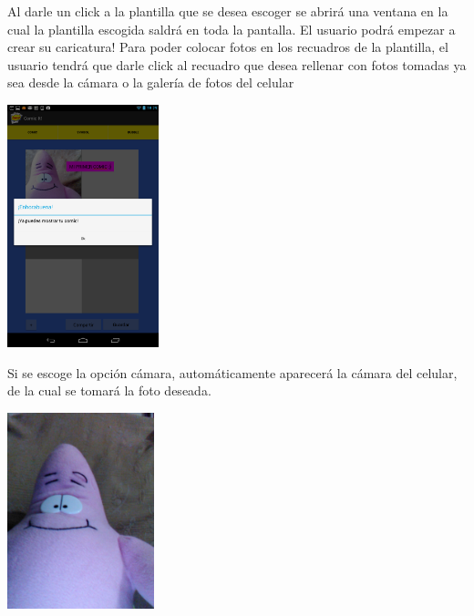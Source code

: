 \documentclass[12pt]{report}
\begin{document}
Al darle un click a la plantilla que se desea escoger se abrirá una ventana en la cual la plantilla escogida saldrá en toda la pantalla. El usuario podrá empezar a crear su caricatura!
Para poder colocar fotos en los recuadros de la plantilla, el usuario tendrá que darle click al recuadro que desea rellenar con fotos tomadas ya sea desde la cámara o la galería de fotos del celular
\newline
\newline
	\begin{center}
		\begingroup
			\includegraphics[width=0.33\textwidth]{imagenes_usuario/camara.png}
		\endgroup
	\end{center}

Si se escoge la opción cámara, automáticamente aparecerá la cámara del celular, de la cual se tomará la foto deseada.
\newline
	\begin{center}
		\begingroup
			\includegraphics[width=0.32\textwidth]{imagenes_usuario/foto.jpg}
		\endgroup
	\end{center}
\end{document}
